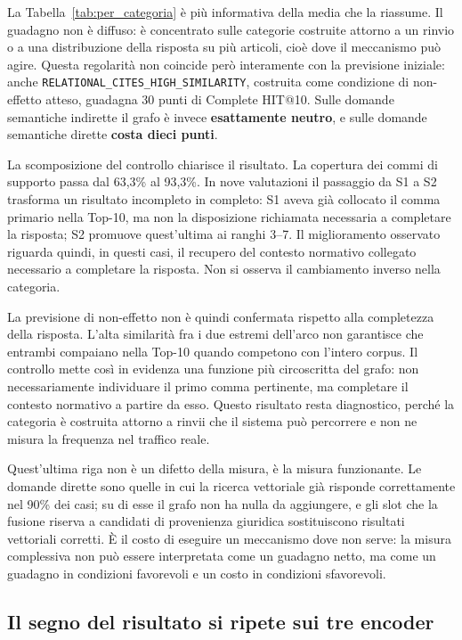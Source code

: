 La Tabella~\ref{tab:per_categoria} è più informativa della media che la riassume. Il guadagno non è diffuso: è concentrato sulle categorie costruite attorno a un rinvio o a una distribuzione della risposta su più articoli, cioè dove il meccanismo può agire. Questa regolarità non coincide però interamente con la previsione iniziale: anche \mbox{\texttt{RELATIONAL\_CITES\_HIGH\_SIMILARITY}}, costruita come condizione di non-effetto atteso, guadagna 30 punti di Complete HIT@10. Sulle domande semantiche indirette il grafo è invece \textbf{esattamente neutro}, e sulle domande semantiche dirette \textbf{costa dieci punti}.

La scomposizione del controllo chiarisce il risultato. La copertura dei commi di supporto passa dal 63,3\% al 93,3\%. In nove valutazioni il passaggio da S1 a S2 trasforma un risultato incompleto in completo: S1 aveva già collocato il comma primario nella Top-10, ma non la disposizione richiamata necessaria a completare la risposta; S2 promuove quest'ultima ai ranghi 3--7. Il miglioramento osservato riguarda quindi, in questi casi, il recupero del contesto normativo collegato necessario a completare la risposta. Non si osserva il cambiamento inverso nella categoria.

La previsione di non-effetto non è quindi confermata rispetto alla completezza della risposta. L'alta similarità fra i due estremi dell'arco non garantisce che entrambi compaiano nella Top-10 quando competono con l'intero corpus. Il controllo mette così in evidenza una funzione più circoscritta del grafo: non necessariamente individuare il primo comma pertinente, ma completare il contesto normativo a partire da esso. Questo risultato resta diagnostico, perché la categoria è costruita attorno a rinvii che il sistema può percorrere e non ne misura la frequenza nel traffico reale.

Quest'ultima riga non è un difetto della misura, è la misura funzionante. Le domande dirette sono quelle in cui la ricerca vettoriale già risponde correttamente nel 90\% dei casi; su di esse il grafo non ha nulla da aggiungere, e gli slot che la fusione riserva a candidati di provenienza giuridica sostituiscono risultati vettoriali corretti. È il costo di eseguire un meccanismo dove non serve: la misura complessiva non può essere interpretata come un guadagno netto, ma come un guadagno in condizioni favorevoli e un costo in condizioni sfavorevoli.


\subsection{Il segno del risultato si ripete sui tre encoder}
\label{sec:invarianza_encoder}

